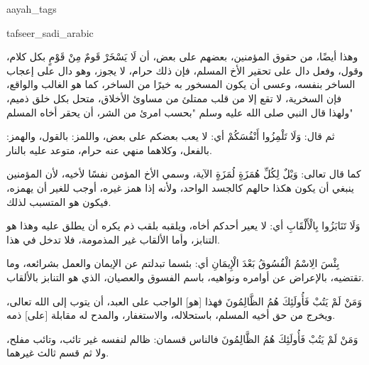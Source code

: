 \begin{taggedblock}{aayah_tags}
\end{taggedblock}
\begin{taggedblock}{tafseer_sadi_arabic}
\begin{Arabic}
وهذا أيضًا، من حقوق المؤمنين، بعضهم على بعض، أن
{ لَا يَسْخَرْ قَومٌ مِنْ قَوْمٍ }
بكل كلام، وقول، وفعل دال على تحقير الأخ المسلم، فإن ذلك حرام، لا يجوز، وهو دال على إعجاب الساخر بنفسه، وعسى أن يكون المسخور به خيرًا من الساخر، كما هو  الغالب والواقع، فإن السخرية، لا تقع إلا من قلب ممتلئ من مساوئ الأخلاق، متحل بكل خلق ذميم، ولهذا قال النبي صلى الله عليه وسلم
"بحسب امرئ من الشر، أن يحقر أخاه المسلم"

ثم قال:
{ وَلَا تَلْمِزُوا أَنْفُسَكُمْ }
أي: لا يعب بعضكم على بعض، واللمز: بالقول، والهمز: بالفعل، وكلاهما منهي عنه حرام، متوعد عليه بالنار.

كما قال تعالى:
{ وَيْلٌ لِكُلِّ هُمَزَةٍ لُمَزَةٍ }
الآية، وسمي الأخ المؤمن  نفسًا لأخيه، لأن المؤمنين ينبغي أن يكون هكذا حالهم كالجسد الواحد، ولأنه إذا همز غيره، أوجب للغير أن يهمزه، فيكون هو المتسبب لذلك.

{ وَلَا تَنَابَزُوا بِالْأَلْقَابِ }
أي: لا يعير أحدكم أخاه، ويلقبه بلقب ذم يكره أن يطلق عليه  وهذا هو التنابز، وأما الألقاب غير المذمومة، فلا تدخل في هذا.

{ بِئْسَ الِاسْمُ الْفُسُوقُ بَعْدَ الْإِيمَانِ }
أي: بئسما تبدلتم عن الإيمان والعمل بشرائعه، وما تقتضيه، بالإعراض عن أوامره ونواهيه، باسم الفسوق والعصيان، الذي هو التنابز بالألقاب.

{ وَمَنْ لَمْ يَتُبْ فَأُولَئِكَ هُمُ الظَّالِمُونَ }
فهذا
[هو]
الواجب على العبد، أن يتوب إلى الله تعالى، ويخرج من حق أخيه المسلم، باستحلاله، والاستغفار، والمدح له مقابلة
[على]
ذمه.

{ وَمَنْ لَمْ يَتُبْ فَأُولَئِكَ هُمُ الظَّالِمُونَ }
فالناس قسمان: ظالم لنفسه غير تائب، وتائب مفلح، ولا ثم قسم ثالث غيرهما.
\end{Arabic}
\end{taggedblock}
